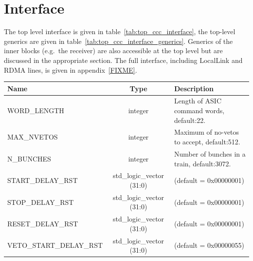 \documentclass[]{report}
\newcommand*{\dittostraight}{---\textquotedbl---} %
\begin{document}
    \section{Interface} %
    \label{sub:top_interface}
    The top level interface is given in table~\ref{tab:top_ccc_interface}, the top-level generics are given in table~\ref{tab:top_ccc_interface_generics}. Generics of the inner blocks (e.g.\ the receiver) are also accessible at the top level but are discussed in the appropriate section. The full interface, including LocalLink and RDMA lines, is given in appendix~\ref{FIXME}. %
    \begin{table}
        \begin{center}
            \begin{tabulary}{\textwidth}{l | c | L}
                Name & Type & Description \\
                \hline
                WORD\_LENGTH               & integer                   & Length of ASIC command words, default:22.    \\
                MAX\_NVETOS                & integer                   & Maximum of no-vetos to accept, default:512.  \\
                N\_BUNCHES                 & integer                   & Number of bunches in a train, default:3072.  \\ 
                START\_DELAY\_RST          & std\_logic\_vector (31:0) & (default = 0x00000001)                \\
                STOP\_DELAY\_RST           & std\_logic\_vector (31:0) & (default = 0x00000001)                \\
                RESET\_DELAY\_RST          & std\_logic\_vector (31:0) & (default = 0x00000001)                \\
                VETO\_START\_DELAY\_RST    & std\_logic\_vector (31:0) & (default = 0x00000055)                \\

\end{tabulary}
\end{center}
\end{table}
\end{document}
